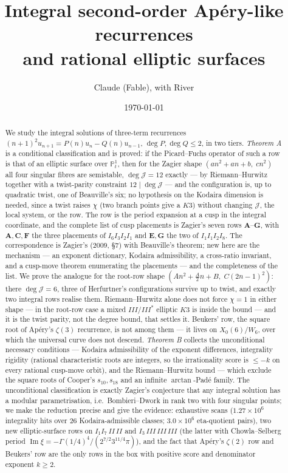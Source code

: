 \documentclass[11pt,reqno]{amsart}
\theoremstyle{plain}
\theoremstyle{definition}
\theoremstyle{remark}
\theoremstyle{plain}
\newcommand{\PP}{\mathbb{P}}
\begin{document}
\title[Integral second-order rows and elliptic surfaces]
      {Integral second-order Ap\'ery-like recurrences\\ and rational elliptic surfaces}
\author{Claude (Fable), with River}
\date{\today}

\begin{abstract}
We study the integral solutions of three-term recurrences
$(n+1)^2u_{n+1}=P(n)u_n-Q(n)u_{n-1}$, $\deg P,\deg Q\le2$, in two tiers.
\emph{Theorem A} is a conditional classification and is proved: if the
Picard--Fuchs operator of such a row is that of an elliptic surface over
$\PP^1_t$, then for the Zagier shape $(an^2+an+b,\;cn^2)$ all four singular
fibres are semistable, $\deg\mathcal J=12$ exactly --- by Riemann--Hurwitz
together with a twist-parity constraint $12\mid\deg\mathcal J$ --- and the
configuration is, up to quadratic twist, one of Beauville's six; no hypothesis on
the Kodaira dimension is needed, since a twist raises $\chi$ (two branch points
give a $K3$) without changing $\mathcal J$, the local system, or the row. The row
is the period expansion at a cusp in the integral coordinate, and the complete
list of cusp placements is Zagier's seven rows
$\mathbf A$--$\mathbf G$, with $\mathbf A,\mathbf C,\mathbf F$ the three
placements of $I_6I_3I_2I_1$ and $\mathbf E,\mathbf G$ the two of
$I_1I_1I_2I_8$. The correspondence is Zagier's (2009, \S7) with Beauville's
theorem; new here are the mechanism --- an exponent dictionary, Kodaira
admissibility, a cross-ratio invariant, and a cusp-move theorem enumerating the
placements --- and the completeness of the list. We prove the analogue for the
root-row shape $(An^2+\tfrac A2n+B,\;C(2n-1)^2)$: there $\deg\mathcal J=6$,
three of Herfurtner's configurations survive up to twist, and exactly two
integral rows realise them. Riemann--Hurwitz alone does not force $\chi=1$ in
either shape --- in the root-row case a mixed $III/III^*$ elliptic $K3$ is inside
the bound --- and it is the twist parity, not the degree bound, that settles it.
Beukers' row, the square root of Ap\'ery's $\zeta(3)$ recurrence, is not among
them --- it lives on $X_0(6)/W_6$, over which the
universal curve does not descend. \emph{Theorem B} collects the unconditional
necessary conditions --- Kodaira admissibility of the exponent differences,
integrality rigidity (rational characteristic roots are integers, so the
irrationality score is $\le-k$ on every rational cusp-move orbit), and the
Riemann--Hurwitz bound --- which exclude the square roots of Cooper's
$s_{10},s_{18}$ and an infinite $\arctan$-Pad\'e family. The unconditional
classification is exactly Zagier's conjecture that any integral solution has a
modular parametrisation, i.e.\ Bombieri--Dwork in rank two with four singular
points; we make the reduction precise and give the evidence: exhaustive scans
($1.27\times10^6$ integrality hits over $26$ Kodaira-admissible classes;
$3.0\times10^6$ eta-quotient pairs), two new elliptic-surface rows on
$I_1I_7\,II\,II$ and $I_3\,III\,III\,III$ (the latter with Chowla--Selberg period
$\operatorname{Im}\xi=-\Gamma(1/4)^4/(2^{7/2}3^{11/4}\pi)$), and the fact that
Ap\'ery's $\zeta(2)$ row and Beukers' row are the only rows in the box with
positive score and denominator exponent $k\ge2$.
\end{abstract}
\end{document}
